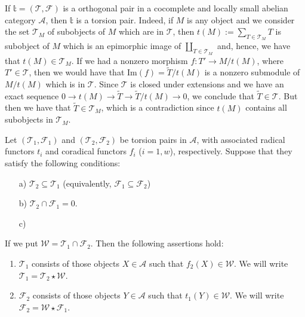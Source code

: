 \sepline

If $\mathbb{t}=(\mathcal{T},\mathcal{F})$ is a orthogonal pair in a cocomplete and locally small abelian category $\mathcal{A}$, then $\mathbb{t}$ is a torsion pair. Indeed, if $M$ is any object and we consider the set $\mathcal{T}_M$ of subobjects of $M$ which are in $\mathcal{T}$, then $t(M):=\sum_{T\in\mathcal{T}_M}T$ is subobject of $M$ which is an epimorphic image of $\coprod_{T\in\mathcal{T}_M}$ and, hence, we have that $t(M)\in\mathcal{T}_M$.
If we had a nonzero morphism $f:T'\longrightarrow M/t(M)$, where $T'\in\mathcal{T}$, then we would have that $\text{Im}(f)=\tilde{T}/t(M)$ is a nonzero submodule of $M/t(M)$ which is in $\mathcal{T}$. Since $\mathcal{T}$ is closed under extensions and we have an exact sequence $0\rightarrow t(M)\longrightarrow\tilde{T}\longrightarrow \tilde{T}/t(M)\rightarrow 0$, we conclude that $\tilde{T}\in\mathcal{T}$. But then we have that $\tilde{T}\in\mathcal{T}_M$, which is a contradiction since $t(M)$ contains all subobjects in $\mathcal{T}_M$.

\sepline

\begin{lemma}
  Let $(\mathcal{T}_1,\mathcal{F}_1)$ and $(\mathcal{T}_2,\mathcal{F}_2)$ be torsion pairs in $\mathcal{A}$, with associated radical functors $t_i$ and coradical functors $f_i$ ($i=1,w$), respectively. Suppose that they satisfy the following conditions:
    \begin{enumerate}
    \item[a)] $\mathcal{T}_2\subseteq\mathcal{T}_1$ (equivalently, $\mathcal{F}_1\subseteq\mathcal{F}_2$)
    \item[b)] $\mathcal{T}_2\cap\mathcal{F}_1=0$.
    \item[c)] $ $
    \end{enumerate}
    If we put $\mathcal{W}=\mathcal{T}_1\cap\mathcal{F}_2$. Then the following assertions hold:

    \begin{enumerate}
    \item $\mathcal{T}_1$ consists of those objects $X\in\mathcal{A}$ such that $f_2(X)\in\mathcal{W}$. We will write $\mathcal{T}_1=\mathcal{T}_2\star\mathcal{W}$.
    \item $\mathcal{F}_2$ consists of those objects $Y\in\mathcal{A}$ such that $t_1(Y)\in\mathcal{W}$. We will write $\mathcal{F}_2=\mathcal{W}\star\mathcal{F}_1$.
    \end{enumerate}

\end{lemma}

